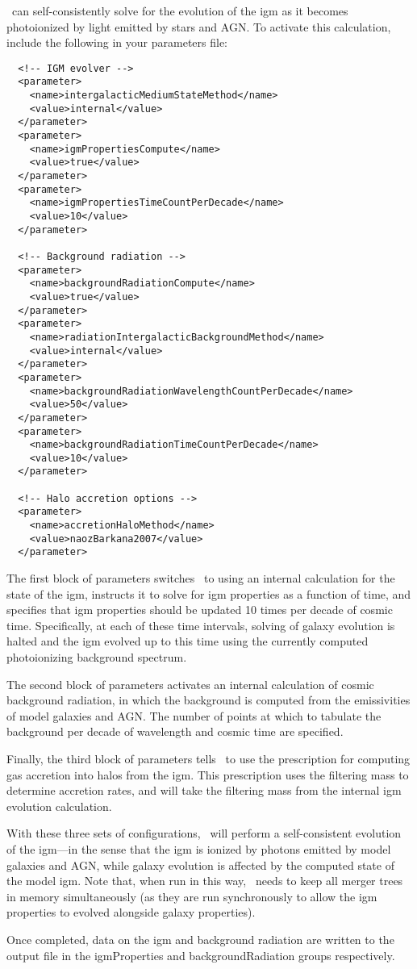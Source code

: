 \glc\ can self-consistently solve for the evolution of the \gls{igm} as it becomes photoionized by light emitted by stars and AGN. To activate this calculation, include the following in your parameters file:
\begin{verbatim}
  <!-- IGM evolver -->
  <parameter>
    <name>intergalacticMediumStateMethod</name>
    <value>internal</value>
  </parameter>
  <parameter>
    <name>igmPropertiesCompute</name>
    <value>true</value>
  </parameter>
  <parameter>
    <name>igmPropertiesTimeCountPerDecade</name>
    <value>10</value>
  </parameter>
  
  <!-- Background radiation -->
  <parameter>
    <name>backgroundRadiationCompute</name>
    <value>true</value>
  </parameter>
  <parameter>
    <name>radiationIntergalacticBackgroundMethod</name>
    <value>internal</value>
  </parameter>
  <parameter>
    <name>backgroundRadiationWavelengthCountPerDecade</name>
    <value>50</value>
  </parameter>
  <parameter>
    <name>backgroundRadiationTimeCountPerDecade</name>
    <value>10</value>
  </parameter>

  <!-- Halo accretion options -->
  <parameter>
    <name>accretionHaloMethod</name>
    <value>naozBarkana2007</value>
  </parameter>
\end{verbatim}
The first block of parameters switches \glc\ to using an internal calculation for the state of the \gls{igm}, instructs it to solve for \gls{igm} properties as a function of time, and specifies that \gls{igm} properties should be updated 10 times per decade of cosmic time. Specifically, at each of these time intervals, solving of galaxy evolution is halted and the \gls{igm} evolved up to this time using the currently computed photoionizing background spectrum.

The second block of parameters activates an internal calculation of cosmic background radiation, in which the background is computed from the emissivities of model galaxies and AGN. The number of points at which to tabulate the background per decade of wavelength and cosmic time are specified.

Finally, the third block of parameters tells \glc\ to use the \cite{naoz_formation_2007} prescription for computing gas accretion into halos from the \gls{igm}. This prescription uses the filtering mass to determine accretion rates, and will take the filtering mass from the internal \gls{igm} evolution calculation.

With these three sets of configurations, \glc\ will perform a self-consistent evolution of the \gls{igm}---in the sense that the \gls{igm} is ionized by photons emitted by model galaxies and AGN, while galaxy evolution is affected by the computed state of the model \gls{igm}. Note that, when run in this way, \glc\ needs to keep all merger trees in memory simultaneously (as they are run synchronously to allow the \gls{igm} properties to evolved alongside galaxy properties).

Once completed, data on the \gls{igm} and background radiation are written to the output file in the {\normalfont \ttfamily igmProperties} and {\normalfont \ttfamily backgroundRadiation} groups respectively.
